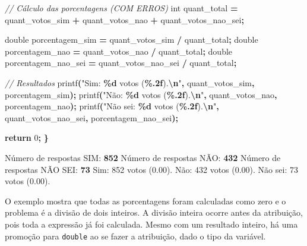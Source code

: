 \documentclass[
  11pt,
  a4paper,
]{scrbook}
\newenvironment{Shaded}{\begin{snugshade}}{\end{snugshade}}
\newcommand{\CommentTok}[1]{\textcolor[rgb]{0.56,0.35,0.01}{\textit{#1}}}
\newcommand{\ControlFlowTok}[1]{\textcolor[rgb]{0.13,0.29,0.53}{\textbf{#1}}}
\newcommand{\DataTypeTok}[1]{\textcolor[rgb]{0.13,0.29,0.53}{#1}}
\newcommand{\DecValTok}[1]{\textcolor[rgb]{0.00,0.00,0.81}{#1}}
\newcommand{\KeywordTok}[1]{\textcolor[rgb]{0.13,0.29,0.53}{\textbf{#1}}}
\newcommand{\NormalTok}[1]{#1}
\newcommand{\OperatorTok}[1]{\textcolor[rgb]{0.81,0.36,0.00}{\textbf{#1}}}
\newcommand{\SpecialCharTok}[1]{\textcolor[rgb]{0.81,0.36,0.00}{\textbf{#1}}}
\newcommand{\StringTok}[1]{\textcolor[rgb]{0.31,0.60,0.02}{#1}}
\begin{document}
\begin{Shaded}
\begin{Highlighting}[]
    \CommentTok{// Cálculo das porcentagens (COM ERROS)}
    \DataTypeTok{int}\NormalTok{ quant\_total }\OperatorTok{=}\NormalTok{ quant\_votos\_sim }\OperatorTok{+}\NormalTok{ quant\_votos\_nao }\OperatorTok{+}\NormalTok{ quant\_votos\_nao\_sei}\OperatorTok{;}

    \DataTypeTok{double}\NormalTok{ porcentagem\_sim }\OperatorTok{=}\NormalTok{ quant\_votos\_sim }\OperatorTok{/}\NormalTok{ quant\_total}\OperatorTok{;}
    \DataTypeTok{double}\NormalTok{ porcentagem\_nao }\OperatorTok{=}\NormalTok{ quant\_votos\_nao }\OperatorTok{/}\NormalTok{ quant\_total}\OperatorTok{;}
    \DataTypeTok{double}\NormalTok{ porcentagem\_nao\_sei }\OperatorTok{=}\NormalTok{ quant\_votos\_nao\_sei }\OperatorTok{/}\NormalTok{ quant\_total}\OperatorTok{;}

    \CommentTok{// Resultados}
\NormalTok{    printf}\OperatorTok{(}\StringTok{"Sim: }\SpecialCharTok{\%d}\StringTok{ votos (}\SpecialCharTok{\%.2f}\StringTok{).}\SpecialCharTok{\textbackslash{}n}\StringTok{"}\OperatorTok{,}\NormalTok{ quant\_votos\_sim}\OperatorTok{,}\NormalTok{ porcentagem\_sim}\OperatorTok{);}
\NormalTok{    printf}\OperatorTok{(}\StringTok{"Não: }\SpecialCharTok{\%d}\StringTok{ votos (}\SpecialCharTok{\%.2f}\StringTok{).}\SpecialCharTok{\textbackslash{}n}\StringTok{"}\OperatorTok{,}\NormalTok{ quant\_votos\_nao}\OperatorTok{,}\NormalTok{ porcentagem\_nao}\OperatorTok{);}
\NormalTok{    printf}\OperatorTok{(}\StringTok{"Não sei: }\SpecialCharTok{\%d}\StringTok{ votos (}\SpecialCharTok{\%.2f}\StringTok{).}\SpecialCharTok{\textbackslash{}n}\StringTok{"}\OperatorTok{,}\NormalTok{ quant\_votos\_nao\_sei}\OperatorTok{,}
\NormalTok{           porcentagem\_nao\_sei}\OperatorTok{);}

    \ControlFlowTok{return} \DecValTok{0}\OperatorTok{;}
\OperatorTok{\}}
\end{Highlighting}
\end{Shaded}

\begin{Shaded}
\begin{Highlighting}[]
\NormalTok{Número de respostas SIM: }\KeywordTok{ 852 }
\NormalTok{Número de respostas NÃO: }\KeywordTok{ 432 }
\NormalTok{Número de respostas NÃO SEI: }\KeywordTok{ 73 }
\NormalTok{Sim: 852 votos (0.00).}
\NormalTok{Não: 432 votos (0.00).}
\NormalTok{Não sei: 73 votos (0.00).}
\end{Highlighting}
\end{Shaded}

O exemplo mostra que todas as porcentagens foram calculadas como zero e
o problema é a divisão de dois inteiros. A divisão inteira ocorre antes
da atribuição, pois toda a expressão já foi calculada. Mesmo com um
resultado inteiro, há uma promoção para \texttt{double} ao se fazer a
atribuição, dado o tipo da variável.
\end{document}
